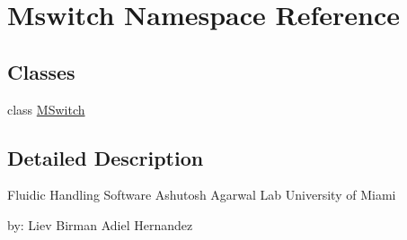 \hypertarget{namespace_mswitch}{}\section{Mswitch Namespace Reference}
\label{namespace_mswitch}
\subsection*{Classes}
\begin{DoxyCompactItemize}
\item 
class \mbox{\hyperlink{class_mswitch_1_1_m_switch}{M\+Switch}}
\end{DoxyCompactItemize}


\subsection{Detailed Description}
\begin{DoxyVerb}Fluidic Handling Software
Ashutosh Agarwal Lab
University of Miami

by:
Liev Birman
Adiel Hernandez
\end{DoxyVerb}
 